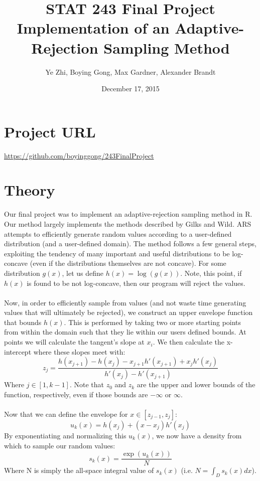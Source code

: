 \documentclass[12pt, oneside]{article}
\title{STAT 243 Final Project\\Implementation of an Adaptive-Rejection Sampling Method}
\author{Ye Zhi, Boying Gong, Max Gardner, Alexander Brandt}
\date{December 17, 2015}
\begin{document}
\maketitle

\section{Project URL}

\url{https://github.com/boyinggong/243FinalProject}

\section{Theory}

Our final project was to implement an adaptive-rejection sampling method in R.  Our method largely implements the methods described by Gilks and Wild.  ARS attempts to efficiently generate random values according to a user-defined distribution (and a user-defined domain).  The method follows a few general steps, exploiting the tendency of many important and useful distributions to be log-concave (even if the distributions themselves are not concave).  For some distribution \(g(x)\), let us define \(h(x) = \log(g(x))\).  Note, this point, if \(h(x)\) is found to be not log-concave, then our program will reject the values.
\\\\
Now, in order to efficiently sample from values (and not waste time generating values that will ultimately be rejected), we construct an upper envelope function that bounds \(h(x)\).  This is performed by taking two or more starting points from within the domain such that they lie within our users defined bounds.  At points we will calculate the tangent's slope at \(x_i\).  We then calculate the x-intercept where these slopes meet with:
\[ z_j = \frac{h(x_{j+1}) - h(x_j) - x_{j+1}h'(x_{j+1}) + x_j h'(x_j)}{h'(x_j) - h'(x_{j+1})} \]
Where \(j \in [1,k-1]\).  Note that \(z_0\) and \(z_k\) are the upper and lower bounds of the function, respectively, even if those bounds are \(-\infty\) or \(\infty\).
\\\\
Now that we can define the envelope for \(x \in [z_{j-1}, z_j]\):
\[ u_k(x) = h(x_j) + (x - x_j)h'(x_j) \]
By exponentiating and normalizing this \(u_k(x)\), we now have a density from which to sample our random values:
\[ s_k(x) = \frac{\exp(u_k(x))}{N} \]
Where N is simply the all-space integral value of \(s_k(x)\) (i.e. \(N = \int_D s_k(x) dx \)).
\end{document}
